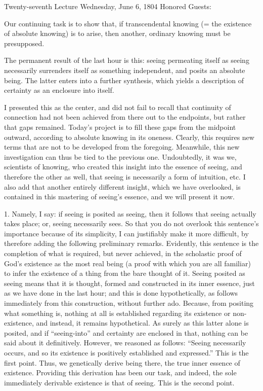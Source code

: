 Twenty-seventh Lecture
Wednesday, June 6, 1804
Honored Guests:

Our continuing task is to show that,
if transcendental knowing
(= the existence of absolute knowing)
is to arise, then another,
ordinary knowing must be presupposed.

The permanent result of the last hour is this:
seeing permeating itself as seeing
necessarily surrenders itself
as something independent,
and posits an absolute being.
The latter enters into a further synthesis,
which yields a description of certainty
as an enclosure into itself.

I presented this as the center,
and did not fail to recall
that continuity of connection
had not been achieved
from there out to the endpoints,
but rather that gaps remained.
Today’s project is to fill these gaps
from the midpoint outward,
according to absolute knowing
in its oneness.
Clearly, this requires new terms
that are not to be developed from the foregoing.
Meanwhile, this new investigation can
thus be tied to the previous one.
Undoubtedly, it was we, scientists of knowing,
who created this insight into the essence of seeing,
and therefore the other as well,
that seeing is necessarily a form of intuition, etc.
I also add that another entirely different insight,
which we have overlooked, is contained in
this mastering of seeing’s essence,
and we will present it now.

1. Namely, I say:
if seeing is posited as seeing,
then it follows that seeing actually takes place;
or, seeing necessarily sees.
So that you do not overlook this sentence’s importance
because of its simplicity,
I can justifiably make it more difficult,
by therefore adding the following preliminary remarks.
Evidently, this sentence is the completion
of what is required, but never achieved,
in the scholastic proof of God’s existence
as the most real being
(a proof with which you are all familiar)
to infer the existence of a thing
from the bare thought of it.
Seeing posited as seeing means that
it is thought, formed and constructed
in its inner essence,
just as we have done in the last hour;
and this is done hypothetically,
as follows immediately from this construction,
without further ado.
Because, from positing what something is,
nothing at all is established regarding
its existence or non-existence,
and instead, it remains hypothetical.
As surely as this latter alone is posited,
and if “seeing-into” and certainty are enclosed in that,
nothing can be said about it definitively.
However, we reasoned as follows:
“Seeing necessarily occurs,
and so its existence is
positively established and expressed.”
This is the first point.
Thus, we genetically derive being there,
the true inner essence of existence.
Providing this derivation has been our task,
and indeed, the sole immediately derivable
existence is that of seeing.
This is the second point.

